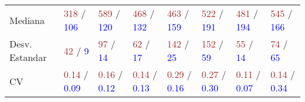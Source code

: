 \begin{table}[!h]
\begin{tabular}{p{2.4cm} p{1.3cm} p{1.3cm} p{1.3cm} p{1.3cm} p{1.3cm} p{1.3cm} p{1.3cm}}
		Mediana & \textcolor{brown}{318} / \textcolor{blue}{106} & \textcolor{brown}{589} / \textcolor{blue}{120} & \textcolor{brown}{468} / \textcolor{blue}{132} & \textcolor{brown}{463} / \textcolor{blue}{159} & \textcolor{brown}{522} / \textcolor{blue}{191} & \textcolor{brown}{481} / \textcolor{blue}{194} & \textcolor{brown}{545} / \textcolor{blue}{166} \\
		Desv. Estandar & \textcolor{brown}{42} / \textcolor{blue}{9} & \textcolor{brown}{97} / \textcolor{blue}{14} & \textcolor{brown}{62} / \textcolor{blue}{17} & \textcolor{brown}{142} / \textcolor{blue}{25} & \textcolor{brown}{152} / \textcolor{blue}{59} & \textcolor{brown}{55} / \textcolor{blue}{14} & \textcolor{brown}{74} / \textcolor{blue}{65} \\
		CV & \textcolor{brown}{0.14} / \textcolor{blue}{0.09} & \textcolor{brown}{0.16} / \textcolor{blue}{0.12} & \textcolor{brown}{0.14} / \textcolor{blue}{0.13} & \textcolor{brown}{0.29} / \textcolor{blue}{0.16} & \textcolor{brown}{0.27} / \textcolor{blue}{0.30} & \textcolor{brown}{0.11} / \textcolor{blue}{0.07} & \textcolor{brown}{0.14} / \textcolor{blue}{0.34} \\ [1ex]
		\hline
	\end{tabular}
	\label{table:tiempo_topo_mediana}
\end{table}

